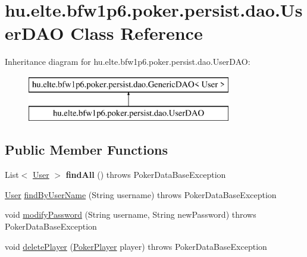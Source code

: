 \hypertarget{classhu_1_1elte_1_1bfw1p6_1_1poker_1_1persist_1_1dao_1_1_user_d_a_o}{}\section{hu.\+elte.\+bfw1p6.\+poker.\+persist.\+dao.\+User\+D\+A\+O Class Reference}
\label{classhu_1_1elte_1_1bfw1p6_1_1poker_1_1persist_1_1dao_1_1_user_d_a_o}
Inheritance diagram for hu.\+elte.\+bfw1p6.\+poker.\+persist.\+dao.\+User\+D\+A\+O\+:\begin{figure}[H]
\begin{center}
\leavevmode
\includegraphics[height=2.000000cm]{classhu_1_1elte_1_1bfw1p6_1_1poker_1_1persist_1_1dao_1_1_user_d_a_o}
\end{center}
\end{figure}
\subsection*{Public Member Functions}
\begin{DoxyCompactItemize}
\item 
\hypertarget{classhu_1_1elte_1_1bfw1p6_1_1poker_1_1persist_1_1dao_1_1_user_d_a_o_acdc1fa19439cafbc55b38a6cf828285f}{}List$<$ \hyperlink{classhu_1_1elte_1_1bfw1p6_1_1poker_1_1model_1_1entity_1_1_user}{User} $>$ {\bfseries find\+All} ()  throws Poker\+Data\+Base\+Exception \label{classhu_1_1elte_1_1bfw1p6_1_1poker_1_1persist_1_1dao_1_1_user_d_a_o_acdc1fa19439cafbc55b38a6cf828285f}

\item 
\hyperlink{classhu_1_1elte_1_1bfw1p6_1_1poker_1_1model_1_1entity_1_1_user}{User} \hyperlink{classhu_1_1elte_1_1bfw1p6_1_1poker_1_1persist_1_1dao_1_1_user_d_a_o_add19b0ad4622ebe7a05eee5e2230cbed}{find\+By\+User\+Name} (String username)  throws Poker\+Data\+Base\+Exception 
\item 
void \hyperlink{classhu_1_1elte_1_1bfw1p6_1_1poker_1_1persist_1_1dao_1_1_user_d_a_o_a27191cddedd780a5eaf37c5a0191cbd7}{modify\+Password} (String username, String new\+Password)  throws Poker\+Data\+Base\+Exception 
\item 
void \hyperlink{classhu_1_1elte_1_1bfw1p6_1_1poker_1_1persist_1_1dao_1_1_user_d_a_o_ae2b1f249cb26c63e0024e32439a11c59}{delete\+Player} (\hyperlink{classhu_1_1elte_1_1bfw1p6_1_1poker_1_1model_1_1entity_1_1_poker_player}{Poker\+Player} player)  throws Poker\+Data\+Base\+Exception 
\end{DoxyCompactItemize}

